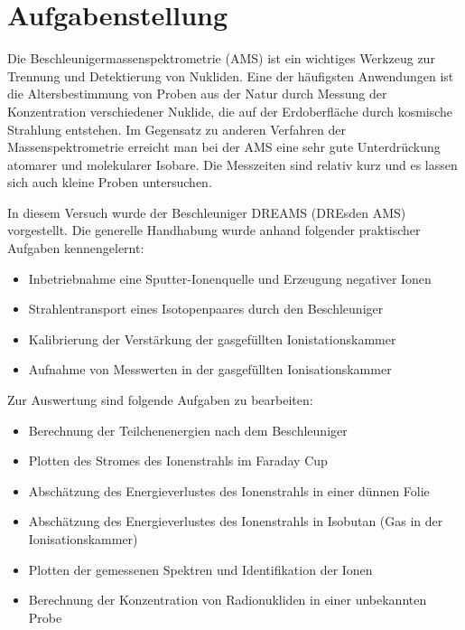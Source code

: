 \section{Aufgabenstellung}
Die Beschleunigermas­senspektrometrie (AMS) ist ein wichtiges Werkzeug zur Trennung und Detektierung von Nukliden.
Eine der häufigsten Anwendungen ist die Altersbestimmung von Proben aus der Natur durch Messung der Konzentration verschiedener Nuklide, die auf der Erdoberfläche durch kosmische Strahlung entstehen.
Im Gegensatz zu anderen Verfahren der Massenspektrometrie erreicht man bei der AMS eine sehr gute Unterdrückung atomarer und molekularer Isobare.
Die Messzeiten sind relativ kurz und es lassen sich auch kleine Proben untersuchen.

In diesem Versuch wurde der Beschleuniger DREAMS (DREsden AMS) vorgestellt.
Die generelle Handhabung wurde anhand folgender praktischer Aufgaben kennengelernt:
\begin{itemize}
  \item Inbetriebnahme eine Sputter-Ionenquelle und Erzeugung negativer Ionen
  \item Strahlentransport eines Isotopenpaares durch den Beschleuniger
  \item Kalibrierung der Verstärkung der gasgefüllten Ionistationskammer
  \item Aufnahme von Messwerten in der gasgefüllten Ionisationskammer
\end{itemize}

Zur Auswertung sind folgende Aufgaben zu bearbeiten:
\begin{itemize}
  \item Berechnung der Teilchenenergien nach dem Beschleuniger
  \item Plotten des Stromes des Ionenstrahls im Faraday Cup
  \item Abschätzung des Energieverlustes des Ionenstrahls in einer dünnen Folie
  \item Abschätzung des Energieverlustes des Ionenstrahls in Isobutan (Gas in der Ionisationskammer)
  \item Plotten der gemessenen Spektren und Identifikation der Ionen
  \item Berechnung der Konzentration von Radionukliden in einer unbekannten Probe
\end{itemize}
